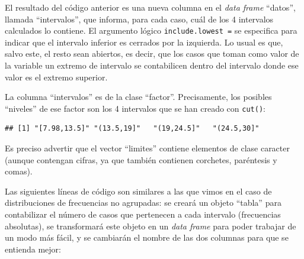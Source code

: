 \documentclass[
]{book}
\newenvironment{Shaded}{\begin{snugshade}}{\end{snugshade}}
\newcommand{\CommentTok}[1]{\textcolor[rgb]{0.56,0.35,0.01}{\textit{#1}}}
\newcommand{\FunctionTok}[1]{\textcolor[rgb]{0.13,0.29,0.53}{\textbf{#1}}}
\newcommand{\NormalTok}[1]{#1}
\newcommand{\OtherTok}[1]{\textcolor[rgb]{0.56,0.35,0.01}{#1}}
\newcommand{\SpecialCharTok}[1]{\textcolor[rgb]{0.81,0.36,0.00}{\textbf{#1}}}
\newcommand{\StringTok}[1]{\textcolor[rgb]{0.31,0.60,0.02}{#1}}
\begin{document}
El resultado del código anterior es una nueva columna en el \emph{data frame} ``datos'', llamada ``intervalos'', que informa, para cada caso, cuál de los 4 intervalos calculados lo contiene.
El argumento lógico \texttt{include.lowest\ =} se especifica para indicar que el intervalo inferior es cerrados por la izquierda.
Lo usual es que, salvo este, el resto sean abiertos, es decir, que los casos que toman como valor de la variable un extremo de intervalo se contabilicen dentro del intervalo donde ese valor es el extremo superior.

La columna ``intervalos'' es de la clase ``factor''.
Precisamente, los posibles ``niveles'' de ese factor son los 4 intervalos que se han creado con \texttt{cut()}:

\begin{Shaded}
\end{Shaded}

\begin{verbatim}
## [1] "[7.98,13.5]" "(13.5,19]"   "(19,24.5]"   "(24.5,30]"
\end{verbatim}

Es preciso advertir que el vector ``limites'' contiene elementos de clase caracter (aunque contengan cifras, ya que también contienen corchetes, paréntesis y comas).

Las siguientes líneas de código son similares a las que vimos en el caso de distribuciones de frecuencias no agrupadas: se creará un objeto ``tabla'' para contabilizar el número de casos que pertenecen a cada intervalo (frecuencias absolutas), se transformará este objeto en un \emph{data frame} para poder trabajar de un modo más fácil, y se cambiarán el nombre de las dos columnas para que se entienda mejor:

\begin{Shaded}
\end{Shaded}
\end{document}
